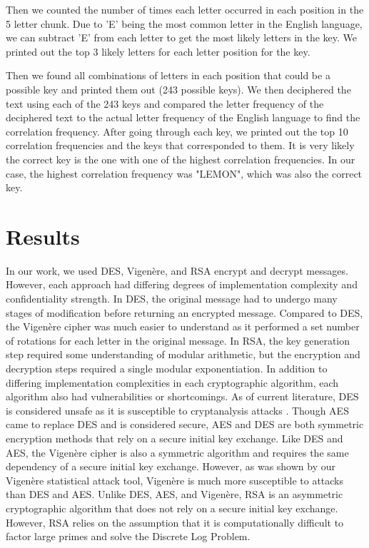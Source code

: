 \documentclass[acmlarge]{acmart}
\begin{document}
Then we counted the number of times each letter occurred in each position in the 5 letter chunk. Due to 'E' being the most common letter in the English language, we can subtract 'E' from each letter to get the most likely letters in the key. We printed out the top 3 likely letters for each letter position for the key.

Then we found all combinations of letters in each position that could be a possible key and printed them out (243 possible keys). We then deciphered the text using each of the 243 keys and compared the letter frequency of the deciphered text to the actual letter frequency of the English language to find the correlation frequency. After going through each key, we printed out the top 10 correlation frequencies and the keys that corresponded to them. It is very likely the correct key is the one with one of the highest correlation frequencies. In our case, the highest correlation frequency was "LEMON", which was also the correct key.

\section{Results}\label{sec:results}

In our work, we used DES, Vigen\`{e}re, and RSA encrypt and decrypt messages. However, each approach had differing degrees of implementation complexity and confidentiality strength. In DES, the original message had to undergo many stages of modification before returning an encrypted message. Compared to DES, the Vigen\`{e}re cipher was much easier to understand as it performed a set number of rotations for each letter in the original message. In RSA, the key generation step required some understanding of modular arithmetic, but the encryption and decryption steps required a single modular exponentiation. In addition to differing implementation complexities in each cryptographic algorithm, each algorithm also had vulnerabilities or shortcomings. As of current literature, DES is considered unsafe as it is susceptible to cryptanalysis attacks \cite{DESCryptanalysis}. Though AES came to replace DES and is considered secure, AES and DES are both symmetric encryption methods that rely on a secure initial key exchange. Like DES and AES, the Vigen\`{e}re cipher is also a symmetric algorithm and requires the same dependency of a secure initial key exchange. However, as was shown by our Vigen\`{e}re statistical attack tool, Vigen\`{e}re is much more susceptible to attacks than DES and AES. Unlike DES, AES, and Vigen\`{e}re, RSA is an asymmetric cryptographic algorithm that does not rely on a secure initial key exchange. However, RSA relies on the assumption that it is computationally difficult to factor large primes and solve the Discrete Log Problem. 
\end{document}
